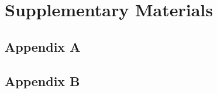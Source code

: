 \documentclass[11pt, a4paper, titles]{report}  %
\begin{document}

\setcounter{secnumdepth}{-2}%

\printbibliography 


\cleardoublepage
{}
{}
\chapter*{\huge\centering Supplementary Materials}  
\section{Appendix A}
%
\section{Appendix B}

\end{document}
